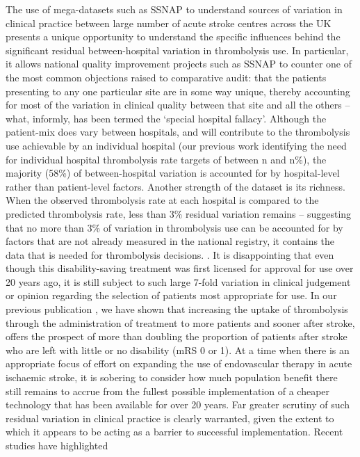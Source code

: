 The use of mega-datasets such as SSNAP to understand sources of variation in clinical practice between large number of acute stroke centres across the UK presents a unique opportunity to understand the specific influences behind the significant residual between-hospital variation in thrombolysis use.  In particular, it allows national quality improvement projects such as SSNAP to counter one of the most common objections raised to comparative audit: that the patients presenting to any one particular site are in some way unique, thereby accounting for most of the variation in clinical quality between that site and all the others – what, informly, has been termed the `special hospital fallacy'. Although the patient-mix does vary between hospitals, and will contribute to the thrombolysis use achievable by an individual hospital (our previous work identifying the need for individual hospital thrombolysis rate targets of between n and n\%), the majority (58\%) of between-hospital variation is accounted for by hospital-level rather than patient-level factors. Another strength of the dataset is its richness. When the observed thrombolysis rate at each hospital is compared to the predicted thrombolysis rate, less than 3\% residual variation remains – suggesting that no more than 3\% of variation in thrombolysis use can be accounted for by factors that are not already measured in the national registry, it contains the data that is needed for thrombolysis decisions. . It is disappointing that even though this disability-saving treatment was first licensed for approval for use over 20 years ago, it is still subject to such large 7-fold variation in clinical judgement or opinion regarding the selection of patients most appropriate for use. In our previous publication \cite{allen_using_2022}, we have shown that increasing the uptake of thrombolysis through the administration of treatment to more patients and sooner after stroke, offers the prospect of more than doubling the proportion of patients after stroke who are left with little or no disability (mRS 0 or 1). At a time when there is an appropriate focus of effort on expanding the use of endovascular therapy in acute ischaemic stroke, it is sobering to consider how much population benefit there still remains to accrue from the fullest possible implementation of a cheaper technology that has been available for over 20 years. Far greater scrutiny of such residual variation in clinical practice is clearly warranted, given the extent to which it appears to be acting as a barrier to successful implementation. Recent studies have highlighted 